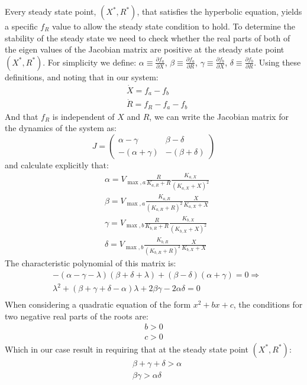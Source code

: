 \documentclass[a4page,notitlepage]{article}
\begin{document}
    Every steady state point, $(X^*,R^*)$, that satisfies the hyperbolic equation, yields a specific $f_R$ value to allow the steady state condition to hold.
    To determine the stability of the steady state we need to check whether the real parts of both of the eigen values of the Jacobian matrix are positive at the steady state point $(X^*,R^*)$.
  For simplicity we define: $\alpha \equiv \frac{\partial f_a}{\partial X}$, $\beta \equiv \frac{\partial f_a}{\partial R}$, $\gamma \equiv \frac{\partial f_b}{\partial X}$, $\delta \equiv \frac{\partial f_b}{\partial R}$.
  Using these definitions, and noting that in our system:
  $$
  \begin{aligned}
      & \dot X = f_a-f_b \\
      & \dot R = f_R-f_a-f_b
  \end{aligned}
  $$
  And that $f_R$ is independent of $X$ and $R$, we can write the Jacobian matrix for the dynamics of the system as:
  $$
  J=
  \begin{pmatrix}
  \alpha - \gamma & \beta - \delta \\
  -(\alpha+\gamma) & -(\beta+\delta)
  \end{pmatrix}
  $$
  and calculate explicitly that:
  $$
  \begin{aligned}
      & \alpha = V_{\max,a}\frac{R}{K_{a,R}+R}\frac{K_{a,X}}{(K_{a,X}+X)^2} \\
      & \beta = V_{\max,a}\frac{K_{a,R}}{(K_{a,R}+R)^2}\frac{X}{K_{a,X}+X}\\
      & \gamma = V_{\max,b}\frac{R}{K_{b,R}+R}\frac{K_{b,X}}{(K_{b,X}+X)^2} \\
      & \delta = V_{\max,b}\frac{K_{b,R}}{(K_{b,R}+R)^2}\frac{X}{K_{b,X}+X}
  \end{aligned}
  $$
  The characteristic polynomial of this matrix is:
  $$
  \begin{aligned}
      &-(\alpha-\gamma-\lambda)(\beta + \delta+\lambda)+(\beta-\delta)(\alpha+\gamma)=0 \Rightarrow\\
      &\lambda^2+(\beta+\gamma+\delta-\alpha)\lambda+2\beta\gamma-2\alpha\delta=0 \\
  \end{aligned}
  $$
  When considering a quadratic equation of the form $x^2+bx+c$, the conditions for two negative real parts of the roots are:
  $$
  \begin{aligned}
      b>0 \\
      c>0
  \end{aligned}
  $$
  Which in our case result in requiring that at the steady state point $(X^*,R^*)$:
  $$
  \begin{aligned}
      &\beta+\gamma+\delta>\alpha \\
      &\beta\gamma>\alpha\delta
  \end{aligned}
  $$
\end{document}
